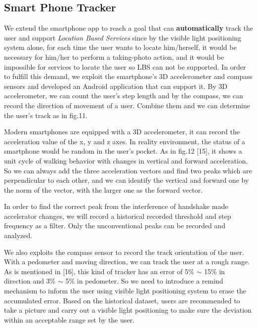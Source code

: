 \documentclass[conference]{IEEEtran}
\begin{document}
\subsection{\textbf{Smart Phone Tracker}}
We extend the smartphone app to reach a goal that can \textbf{automatically} track the user and support \textit{Location Based Services} since by the visible light positioning system alone, for each time the user wants to locate him/herself, it would be necessary for him/her to perform a taking-photo action, and it would be impossible for services to locate the user so LBS can not be supported. In order to fulfill this demand, we exploit the smartphone's 3D accelerometer and compass sensors and developed an Android application that can support it. By 3D accelerometer, we can count the user's step length and by the compass, we can record the direction of movement of a user. Combine them and we can determine the user's track as in fig.11.

Modern smartphones are equipped with a 3D accelerometer, it can record the acceleration value of the x, y and z axes. In reality environment, the status of a smartphone would be random in the user's pocket. As in fig.12 [15], it shows a unit cycle of walking behavior with changes in vertical and forward acceleration. So we can always add the three acceleration vectors and find two peaks which are perpendicular to each other, and we can identify the vertical and forward one by the norm of the vector, with the larger one as the forward vector.

In order to find the correct peak from the interference of handshake made accelerator changes, we will record a historical recorded threshold and step frequency as a filter. Only the unconventional peaks can be recorded and analyzed.

We also exploits the compass sensor to record the track orientation of the user. With a pedometer and moving direction, we can track the user at a rough range. As is mentioned in [16], this kind of tracker has an error of 5\% $\sim$ 15\% in direction and 3\% $\sim$ 5\% in pedometer. So we need to introduce a remind mechanism to inform the user using visible light positioning system to erase the accumulated error. Based on the historical dataset, users are recommended to take a picture and carry out a visible light positioning to make sure the deviation within an acceptable range set by the user.
\begin{figure}
	\footnotesize
\end{figure}
\end{document}
